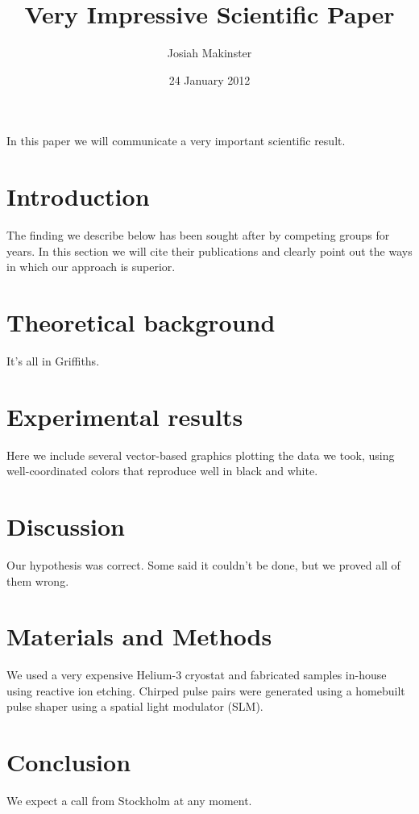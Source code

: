 \documentclass[11pt]{amsart}
\title{Very Impressive Scientific Paper}
\author{Josiah Makinster}
\date{24 January 2012}
\begin{document}
\maketitle

In this paper we will communicate a very important scientific result.

\section{Introduction}

The finding we describe below has been sought after by competing groups
for years. In this section we will cite their publications and clearly
point out the ways in which our approach is superior.

\section{Theoretical background}

It's all in Griffiths.

\section{Experimental results}

Here we include several vector-based graphics plotting the data we
took, using well-coordinated colors that reproduce well in black and
white.

\section{Discussion}

Our hypothesis was correct. Some said it couldn't be done, but we
proved all of them wrong.

\section{Materials and Methods}

We used a very expensive Helium-3 cryostat and fabricated samples
in-house using reactive ion etching. Chirped pulse pairs were
generated using a homebuilt pulse shaper using a spatial light
modulator (SLM).

\section{Conclusion}

We expect a call from Stockholm at any moment.
\end{document}
